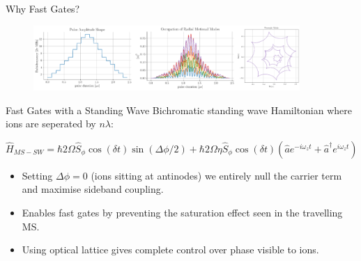 \documentclass[final]{beamer}
\begin{document}
\begin{frame}{}
\begin{center}
\begin{columns}[t]
\begin{column}{0.49\textwidth}
\begin{alertblock}{Why Fast Gates?}
      \begin{figure}
        \includegraphics[width=0.9\textwidth]{./figs/loop_closing.png}
      \end{figure}
    \end{alertblock}

    \begin{alertblock}{Fast Gates with a Standing Wave}
      Bichromatic standing wave Hamiltonian where ions are seperated by $n\lambda$:

      \large$$ \hat{H}_{MS-SW} = \hbar 2\Omega \hat{S}_{\phi}\cos{(\delta t)}\sin{(\Delta\phi/2)} + \hbar 2\Omega\eta \hat{S}_\phi\cos{(\delta t)}(\hat{a}e^{-i\omega_zt} + \hat{a}^\dagger e^{i\omega_zt})\cos{(\Delta\phi/2)}$$\normalsize
      \begin{itemize}
      \item Setting $\Delta\phi = 0$ (ions sitting at antinodes) we
        entirely null the carrier term and maximise sideband
        coupling.\\
      \item Enables fast gates by preventing the saturation effect seen in the travelling MS.\\
      \item Using optical lattice gives complete control over phase visible to ions. \\
      \end{itemize}


\end{alertblock}
\end{column}
\end{columns}
\end{center}
\end{frame}
\end{document}

